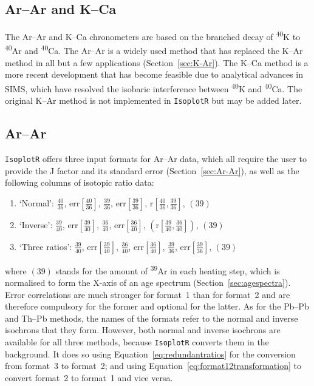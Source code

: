 \begin{refsection}

\chapter{Ar--Ar and K--Ca}\label{ch:ArArKCa}

The Ar--Ar and K--Ca chronometers are based on the branched decay of
\textsuperscript{40}K to \textsuperscript{40}Ar and
\textsuperscript{40}Ca. The Ar--Ar is a widely used method that has
replaced the K--Ar method in all but a few applications
(Section~\ref{sec:K-Ar}). The K--Ca method is a more recent
development that has become feasible due to analytical advances in
SIMS, which have resolved the isobaric interference between
\textsuperscript{40}K and \textsuperscript{40}Ca. The original K--Ar
method is not implemented in \texttt{IsoplotR} but may be added later.

\section{Ar--Ar}

\texttt{IsoplotR} offers three input formats for Ar--Ar data, which
all require the user to provide the J factor and its standard error
(Section~\ref{sec:Ar-Ar}), as well as the following columns of
isotopic ratio data:
\begin{enumerate}
\item{`Normal':}
  $\frac{40}{36}$,  
  $\mbox{err}\!\left[\frac{40}{36}\right]$, 
  $\frac{39}{36}$,  
  $\mbox{err}\!\left[\frac{39}{36}\right]$,  
  $\mbox{r}\!\left[\frac{40}{36},\frac{39}{36}\right]$,
  $\left(39\right)$
\item{`Inverse':}
  $\frac{39}{40}$,  
  $\mbox{err}\!\left[\frac{39}{40}\right]$, 
  $\frac{36}{40}$,  
  $\mbox{err}\!\left[\frac{36}{40}\right]$,  
  $\left(\mbox{r}\!\left[\frac{39}{40},\frac{36}{40}\right]\right)$,
  $\left(39\right)$
\item{`Three ratios':}
  $\frac{39}{40}$,  
  $\mbox{err}\!\left[\frac{39}{40}\right]$, 
  $\frac{36}{40}$,  
  $\mbox{err}\!\left[\frac{36}{40}\right]$,  
  $\frac{39}{36}$,  
  $\mbox{err}\!\left[\frac{39}{36}\right]$,
  $\left(39\right)$
\end{enumerate}

\noindent where $(39)$ stands for the amount of \textsuperscript{39}Ar
in each heating step, which is normalised to form the X-axis of an age
spectrum (Section~\ref{sec:agespectra}). Error correlations are much
stronger for format~1 than for format~2 and are therefore compulsory
for the former and optional for the latter. As for the Pb--Pb and
Th--Pb methods, the names of the formats refer to the normal and
inverse isochrons that they form. However, both normal and inverse
isochrons are available for all three methods, because
\texttt{IsoplotR} converts them in the background. It does so using
Equation~\ref{eq:redundantratios} for the conversion from format~3 to
format~2; and using Equation~\ref{eq:format12transformation} to
convert format~2 to format~1 and vice versa.\\


\end{refsection}
